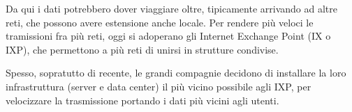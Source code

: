 \documentclass[a4paper,11pt]{article}
\begin{document}
Da qui i dati potrebbero dover viaggiare oltre, tipicamente arrivando ad altre reti, che possono avere estensione anche locale.
Per rendere più veloci le tramissioni fra più reti, oggi si adoperano gli Internet Exchange Point (IX o IXP), che permettono a più reti di unirsi in strutture condivise.

Spesso, sopratutto di recente, le grandi compagnie decidono di installare la loro infrastruttura (server e data center) il più vicino possibile agli IXP, per velocizzare la trasmissione portando i dati più vicini agli utenti.
\end{document}
